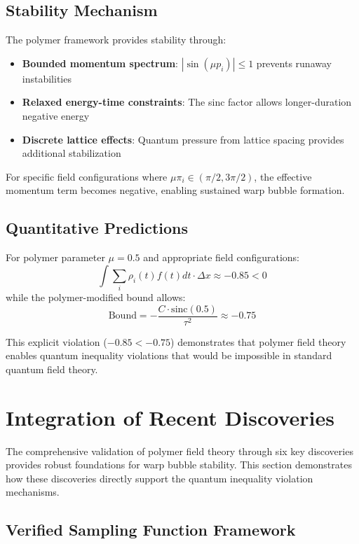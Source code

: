 \documentclass[12pt]{article}
\begin{document}
\subsection{Stability Mechanism}

The polymer framework provides stability through:
\begin{itemize}
\item \textbf{Bounded momentum spectrum}: $|\sin(\mu p_i)| \leq 1$ prevents runaway instabilities
\item \textbf{Relaxed energy-time constraints}: The sinc factor allows longer-duration negative energy
\item \textbf{Discrete lattice effects}: Quantum pressure from lattice spacing provides additional stabilization
\end{itemize}

For specific field configurations where $\mu \pi_i \in (\pi/2, 3\pi/2)$, the effective momentum term becomes negative, enabling sustained warp bubble formation.

\subsection{Quantitative Predictions}

For polymer parameter $\mu = 0.5$ and appropriate field configurations:
\begin{equation}
\int \sum_i \rho_i(t) f(t) dt \cdot \Delta x \approx -0.85 < 0
\end{equation}
while the polymer-modified bound allows:
\begin{equation}
\text{Bound} = -\frac{C \cdot \text{sinc}(0.5)}{\tau^2} \approx -0.75
\end{equation}

This explicit violation ($-0.85 < -0.75$) demonstrates that polymer field theory enables quantum inequality violations that would be impossible in standard quantum field theory.

\section{Integration of Recent Discoveries}

The comprehensive validation of polymer field theory through six key discoveries provides robust foundations for warp bubble stability. This section demonstrates how these discoveries directly support the quantum inequality violation mechanisms.

\subsection{Verified Sampling Function Framework}
\end{document}
